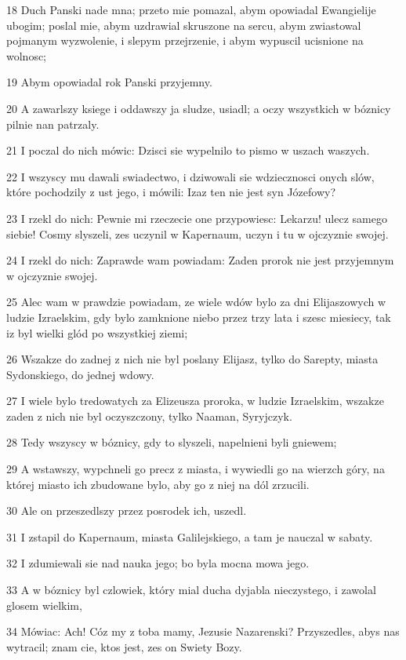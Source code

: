 \par 18 Duch Panski nade mna; przeto mie pomazal, abym opowiadal Ewangielije ubogim; poslal mie, abym uzdrawial skruszone na sercu, abym zwiastowal pojmanym wyzwolenie, i slepym przejrzenie, i abym wypuscil ucisnione na wolnosc;
\par 19 Abym opowiadal rok Panski przyjemny.
\par 20 A zawarlszy ksiege i oddawszy ja sludze, usiadl; a oczy wszystkich w bóznicy pilnie nan patrzaly.
\par 21 I poczal do nich mówic: Dzisci sie wypelnilo to pismo w uszach waszych.
\par 22 I wszyscy mu dawali swiadectwo, i dziwowali sie wdziecznosci onych slów, które pochodzily z ust jego, i mówili: Izaz ten nie jest syn Józefowy?
\par 23 I rzekl do nich: Pewnie mi rzeczecie one przypowiesc: Lekarzu! ulecz samego siebie! Cosmy slyszeli, zes uczynil w Kapernaum, uczyn i tu w ojczyznie swojej.
\par 24 I rzekl do nich: Zaprawde wam powiadam: Zaden prorok nie jest przyjemnym w ojczyznie swojej.
\par 25 Alec wam w prawdzie powiadam, ze wiele wdów bylo za dni Elijaszowych w ludzie Izraelskim, gdy bylo zamknione niebo przez trzy lata i szesc miesiecy, tak iz byl wielki glód po wszystkiej ziemi;
\par 26 Wszakze do zadnej z nich nie byl poslany Elijasz, tylko do Sarepty, miasta Sydonskiego, do jednej wdowy.
\par 27 I wiele bylo tredowatych za Elizeusza proroka, w ludzie Izraelskim, wszakze zaden z nich nie byl oczyszczony, tylko Naaman, Syryjczyk.
\par 28 Tedy wszyscy w bóznicy, gdy to slyszeli, napelnieni byli gniewem;
\par 29 A wstawszy, wypchneli go precz z miasta, i wywiedli go na wierzch góry, na której miasto ich zbudowane bylo, aby go z niej na dól zrzucili.
\par 30 Ale on przeszedlszy przez posrodek ich, uszedl.
\par 31 I zstapil do Kapernaum, miasta Galilejskiego, a tam je nauczal w sabaty.
\par 32 I zdumiewali sie nad nauka jego; bo byla mocna mowa jego.
\par 33 A w bóznicy byl czlowiek, który mial ducha dyjabla nieczystego, i zawolal glosem wielkim,
\par 34 Mówiac: Ach! Cóz my z toba mamy, Jezusie Nazarenski? Przyszedles, abys nas wytracil; znam cie, ktos jest, zes on Swiety Bozy.
